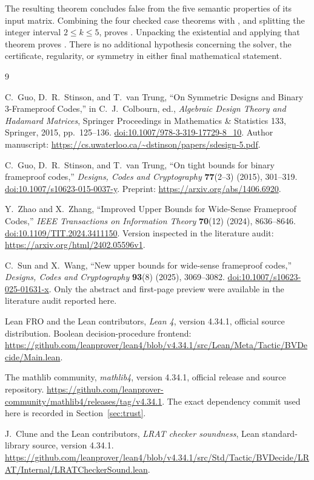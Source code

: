 \documentclass[11pt]{article}
\theoremstyle{definition}
\theoremstyle{remark}
\begin{document}
The resulting theorem  concludes false from the
five semantic properties of its input matrix. Combining the four
checked case theorems with
, and splitting the integer
interval $2\leq k\leq5$, proves
. Unpacking the existential
 and applying that theorem proves
. There is no additional hypothesis concerning
the solver, the certificate, regularity, or symmetry in either final
mathematical statement.

\begin{thebibliography}{9}

C.~Guo, D.~R.~Stinson, and T.~van Trung,
``On Symmetric Designs and Binary 3-Frameproof Codes,''
in C.~J.~Colbourn, ed., \emph{Algebraic Design Theory and Hadamard
Matrices}, Springer Proceedings in Mathematics \& Statistics 133,
Springer, 2015, pp.~125--136.
\href{https://doi.org/10.1007/978-3-319-17729-8_10}{doi:10.1007/978-3-319-17729-8\_10}.
Author manuscript:
\url{https://cs.uwaterloo.ca/~dstinson/papers/sdesign-5.pdf}.

C.~Guo, D.~R.~Stinson, and T.~van Trung,
``On tight bounds for binary frameproof codes,''
\emph{Designs, Codes and Cryptography} \textbf{77}(2--3) (2015),
301--319.
\href{https://doi.org/10.1007/s10623-015-0037-y}{doi:10.1007/s10623-015-0037-y}.
Preprint: \url{https://arxiv.org/abs/1406.6920}.

Y.~Zhao and X.~Zhang,
``Improved Upper Bounds for Wide-Sense Frameproof Codes,''
\emph{IEEE Transactions on Information Theory} \textbf{70}(12)
(2024), 8636--8646.
\href{https://doi.org/10.1109/TIT.2024.3411150}{doi:10.1109/TIT.2024.3411150}.
Version inspected in the literature audit:
\url{https://arxiv.org/html/2402.05596v1}.

C.~Sun and X.~Wang,
``New upper bounds for wide-sense frameproof codes,''
\emph{Designs, Codes and Cryptography} \textbf{93}(8) (2025),
3069--3082.
\href{https://doi.org/10.1007/s10623-025-01631-x}{doi:10.1007/s10623-025-01631-x}.
Only the abstract and first-page preview were available in the
literature audit reported here.

Lean FRO and the Lean contributors,
\emph{Lean 4}, version 4.34.1, official source distribution.
Boolean decision-procedure frontend:
\url{https://github.com/leanprover/lean4/blob/v4.34.1/src/Lean/Meta/Tactic/BVDecide/Main.lean}.

The mathlib community,
\emph{mathlib4}, version 4.34.1, official release and source repository.
\url{https://github.com/leanprover-community/mathlib4/releases/tag/v4.34.1}.
The exact dependency commit used here is recorded in
Section~\ref{sec:trust}.

J.~Clune and the Lean contributors,
\emph{LRAT checker soundness}, Lean standard-library source,
version 4.34.1.
\url{https://github.com/leanprover/lean4/blob/v4.34.1/src/Std/Tactic/BVDecide/LRAT/Internal/LRATCheckerSound.lean}.

\end{thebibliography}
\end{document}

